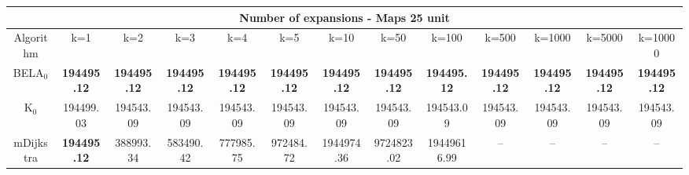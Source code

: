 \begin{tabular}{c|cccccccccccc}\toprule
\multicolumn{13}{c}{Number of expansions - Maps 25 unit}\\ \midrule
Algorithm & k=1 & k=2 & k=3 & k=4 & k=5 & k=10 & k=50 & k=100 & k=500 & k=1000 & k=5000 & k=10000 \\ \midrule
BELA$_0$ & \textbf{194495.12} & \textbf{194495.12} & \textbf{194495.12} & \textbf{194495.12} & \textbf{194495.12} & \textbf{194495.12} & \textbf{194495.12} & \textbf{194495.12} & \textbf{194495.12} & \textbf{194495.12} & \textbf{194495.12} & \textbf{194495.12} \\
K$_0$ & 194499.03 & 194543.09 & 194543.09 & 194543.09 & 194543.09 & 194543.09 & 194543.09 & 194543.09 & 194543.09 & 194543.09 & 194543.09 & 194543.09 \\
mDijkstra & \textbf{194495.12} & 388993.34 & 583490.42 & 777985.75 & 972484.72 & 1944974.36 & 9724823.02 & 19449616.99 & -- & -- & -- & -- \\ \bottomrule 
\end{tabular}
